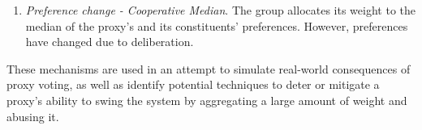 \begin{enumerate}
{    }
    \item {
        \textit{Preference change - Cooperative Median}.
        The group allocates its weight to the median of the proxy's and its
        constituents' preferences.
        However, preferences have changed due to deliberation. 
    }
\end{enumerate}
These mechanisms are used in an attempt to simulate real-world consequences of proxy
voting, as well as identify potential techniques to deter or mitigate a proxy's
ability to swing the system by aggregating a large amount of weight and abusing it.
